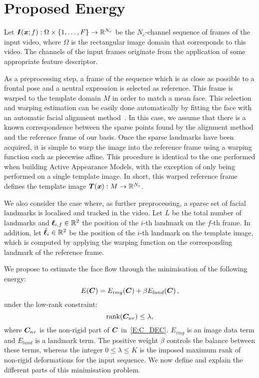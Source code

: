 \section{Proposed Energy}
Let $\boldsymbol{I}(\boldsymbol{x};f):\Omega\times \{1,\ldots,F\} \rightarrow \mathbb{R}^{N_c}$ be the
$N_c$-channel sequence of frames of the input video, where $\Omega$ is the
rectangular image domain that corresponds to this video. The channels of the
input frames originate from the application of some appropriate feature descriptor.

As a preprocessing step, a frame of the sequence which is as close as possible to
a frontal pose and a neutral expression is selected as reference. This frame is
warped to the template domain $M$ in order to match a mean face. This selection
and warping estimation can be easily done automatically by fitting the face
with an automatic facial alignment method~\cite{kazemi2014one,matthews2004active}. In this 
case, we assume that there is a known correspondence between the sparse points
found by the alignment method and the reference frame of our basis. Once the
sparse landmarks have been acquired, it is simple to warp the image into the
reference frame using a warping function such as piecewise affine. This
procedure is identical to the one performed when building Active Appearance
Models, with the exception of only being performed on a single template image.
In short, this warped reference frame defines the template image 
$\boldsymbol{T}(\boldsymbol{x}):M \rightarrow \mathbb{R}^{N_c}$.

We also consider the case where, as further preprocessing, a sparse set of facial
landmarks is localised and tracked in the video. Let $L$ be the total number of
landmarks and $\boldsymbol{\ell}_{i,f}\in\mathbb{R}^2$ the position of the $i$-th landmark on the
$f$-th frame. In addition, let $\hat{\boldsymbol{\ell}}_i\in\mathbb{R}^2$ be the position of the
$i$-th landmark on the template image, which is computed by applying the warping
function on the corresponding landmark of the reference frame.

We propose to estimate the face flow through the minimisation of the following energy:
\begin{equation}
    E(\boldsymbol{C}) = E_{img}(\boldsymbol{C}) + \beta E_{land}(\boldsymbol{C}) \,,
\end{equation}
under the low-rank constraint:
\begin{equation}\label{eq:lowrank}
    \mbox{rank}(\boldsymbol{C}_{nr}) \leq \lambda,
\end{equation}
where $\boldsymbol{C}_{nr}$ is the non-rigid part of $\boldsymbol{C}$ in~\cref{E:C_DEC}. 
$E_{img}$ is an image data 
term and $E_{land}$ is a landmark term. The positive weight $\beta$ 
controls the balance between these terms, whereas the integer $0\leq\lambda\leq K$ is the 
imposed maximum rank of non-rigid deformations for the input sequence. 
We now define and explain the different parts of this minimisation problem.

